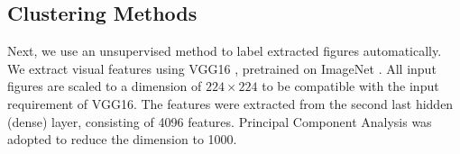 \documentclass{article}
\begin{document}




\subsection{Clustering Methods\label{sec:clusteringmethod}} 
Next, we use an unsupervised method to label
extracted figures automatically.  We extract visual features using
VGG16 \cite{simonyan2014very}, pretrained on ImageNet \cite{deng2009imagenet}. %
All input figures are scaled to a dimension of $224\times224$ to be compatible with the input requirement of VGG16. The features were extracted from the second last hidden (dense) layer, consisting of
4096 features. Principal Component Analysis was adopted to reduce the dimension to 1000.
\end{document}
